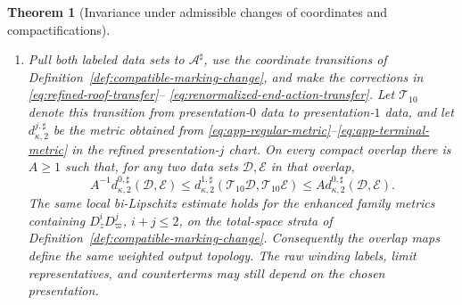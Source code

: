 \documentclass[11pt]{amsart}
\numberwithin{equation}{section}
\newtheorem{theorem}{Theorem}[section]
\theoremstyle{definition}
\theoremstyle{remark}
\begin{document}
\begin{theorem}[Invariance under admissible changes of coordinates and compactifications]
\begin{enumerate}
At the pole, use instead the common physical remaining-time cutoff
$s=\epsilon$.  If $p_j$ denotes the label, in presentation $j$, of the
same physical pole orbit and $z_\epsilon(p)$ is its point with
$t_b-t=\epsilon$, set
\begin{align}
 \Gamma_{\mathrm p,\tau}(p)&=0,
 \label{eq:pole-time-finite-part}\\
 \Gamma_{\mathrm p,B}(p)
 &=\lim_{\epsilon\downarrow0}
   \left\{
    C^0_{\mathrm p,B}(\epsilon,p_0)
    -C^1_{\mathrm p,B}(\epsilon,p_1)
    +\chi_\varpi(z_\epsilon(p))
   \right\}.
 \label{eq:pole-action-finite-part}
\end{align}
These limits have the same mixed-$C^2$ regularity; the gauge term has the
genuine compactified limit required in
Definition~\ref{def:compatible-marking-change}.
For either $\mathsf e\in\{\mathrm a,\mathrm p\}$, if $E_c$ is the compact
end-label map on a refined first-exit component, then
\begin{align}
 \widehat\tau^{\mathrm{ren},1}_{\mathsf e,c}\circ S_{s(c)}
 &=\widehat\tau^{\mathrm{ren},0}_{\mathsf e,c}
   -\delta_{s(c)}-c_\tau k_c
   +\Gamma_{\mathsf e,\tau}\circ E_c,
 \label{eq:renormalized-end-time-transfer}\\
 B^{\mathrm{ren},1}_{\mathsf e,c}\circ S_{s(c)}
 &=B^{\mathrm{ren},0}_{\mathsf e,c}
   -C_{s(c)}+\Gamma_{\mathsf e,B}\circ E_c.
 \label{eq:renormalized-end-action-transfer}
\end{align}
If the primitive is fixed and the gauge representative is chosen as
$\chi=0$, the two charts have the same physical remaining-time singular
part; the common zero finite-part normalization then gives
$\Gamma_{\mathrm p,B}=0$.

\item Pull both labeled data sets to $\mathcal A^\sharp$, use the
coordinate transitions of
Definition~\ref{def:compatible-marking-change}, and make the corrections
in \eqref{eq:refined-roof-transfer}--
\eqref{eq:renormalized-end-action-transfer}.  Let $\mathcal T_{10}$ denote
this transition from presentation-$0$ data to presentation-$1$ data, and
let $d_{\kappa,2}^{j,\sharp}$ be the metric obtained from
\eqref{eq:app-regular-metric}--\eqref{eq:app-terminal-metric} in the
refined presentation-$j$ chart.  On every compact overlap there is
$A\ge1$ such that, for any two data sets $\mathcal D,\mathcal E$ in that
overlap,
\begin{equation}\label{eq:weighted-marking-equivalence}
 A^{-1}d_{\kappa,2}^{0,\sharp}(\mathcal D,\mathcal E)
 \le d_{\kappa,2}^{1,\sharp}
       (\mathcal T_{10}\mathcal D,\mathcal T_{10}\mathcal E)
 \le A d_{\kappa,2}^{0,\sharp}(\mathcal D,\mathcal E).
\end{equation}
The same local bi-Lipschitz estimate holds for the enhanced family metrics
containing $D_z^iD_\varpi^j$, $i+j\le2$, on the total-space strata of
Definition~\ref{def:compatible-marking-change}.  Consequently the overlap
maps define the same weighted output topology.  The raw winding labels,
limit representatives, and counterterms may still depend on the chosen
presentation.
\end{enumerate}
\end{theorem}
\end{document}
